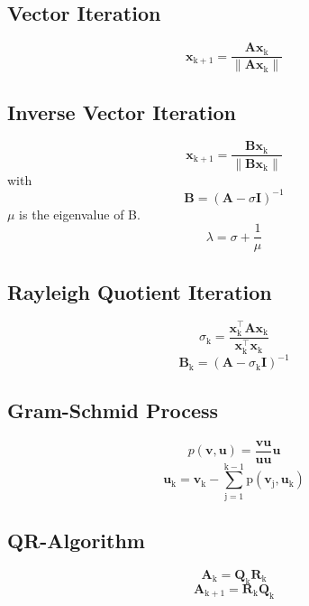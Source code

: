 \documentclass[conference]{journal}%
\begin{document}
	\subsection*{Vector Iteration}
	\begin{equation}
	\textbf{x}_\mathrm{k+1}=\frac{\textbf{Ax}_\mathrm{k}}{\lVert \textbf{Ax}_\mathrm{k} \rVert}
	\end{equation}
	\subsection*{Inverse Vector Iteration}
	\begin{equation}
	\textbf{x}_\mathrm{k+1}=\frac{\textbf{Bx}_\mathrm{k}}{\lVert \textbf{Bx}_\mathrm{k} \rVert}
	\end{equation}
	with
	\begin{equation}
	\textbf{B}=(\textbf{A}-\sigma \textbf{I})^{-1}
	\end{equation}
	$\mu$ is the eigenvalue of B.
	\begin{equation}
	\lambda=\sigma+\frac{1}{\mu}
	\end{equation}
	\subsection*{Rayleigh Quotient Iteration}
	\begin{equation}
	\sigma_{\mathrm{k}}=\frac{\textbf{x}_{\mathrm{k}}^\intercal\textbf{Ax}_{\mathrm{k}}}{\textbf{x}_{\mathrm{k}}^\intercal\textbf{x}_{\mathrm{k}}}
	\end{equation}
	\begin{equation}
	\textbf{B}_{\mathrm{k}}=(\textbf{A}-\sigma_{\mathrm{k}} \textbf{I})^{-1}
	\end{equation}
	\subsection*{Gram-Schmid Process}
	\begin{equation}
	p(\textbf{v},\textbf{u})=\frac{\textbf{v}\textbf{u}}{\textbf{u}\textbf{u}}\textbf{u}
	\end{equation}
	\begin{equation}
	\textbf{u}_{\mathrm{k}} = \textbf{v}_{\mathrm{k}} -\sum_{\mathrm{j=1}}^{\mathrm{k-1}}\mathrm{p}(\textbf{v}_{\mathrm{j}},\textbf{u}_{\mathrm{k}})
	\end{equation}
	\subsection*{QR-Algorithm}
	\begin{equation}
	\textbf{A}_\mathrm{k}={\textbf{Q}_\mathrm{k}}{\textbf{R}_\mathrm{k}}
	\end{equation}
	\begin{equation}
	\textbf{A}_\mathrm{k+1}={\textbf{R}_\mathrm{k}}{\textbf{Q}_\mathrm{k}}
	\end{equation}
\end{document}

